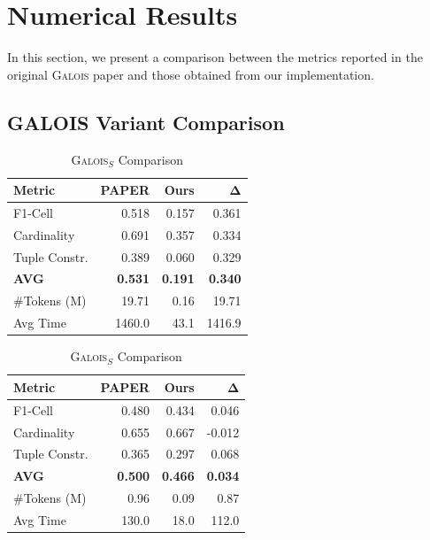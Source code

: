 \section{Numerical Results}
\label{results_galois}
In this section, we present a comparison between the metrics reported in the original \textsc{Galois} paper and those obtained from our implementation.

\subsection{GALOIS Variant Comparison}

\begin{table}[H]
    \centering
    \footnotesize %
    \setlength{\tabcolsep}{3pt} %
    
    \begin{minipage}[t]{0.48\textwidth}
        \centering
        \caption{\textsc{Galois}$_{WO}$ Comparison}
        \label{tab:galoisWO_results}
        \begin{tabular}{lrrr}
            \toprule
            \textbf{Metric} & \textbf{PAPER} & \textbf{Ours} & $\mathbf{\Delta}$ \\
            \midrule
            F1-Cell & 0.518 & 0.157 & 0.361 \\
            Cardinality & 0.691 & 0.357 & 0.334 \\
            Tuple Constr. & 0.389 & 0.060 & 0.329 \\
            \textbf{AVG} & \textbf{0.531} & \textbf{0.191} & \textbf{0.340} \\
            \#Tokens (M) & 19.71 & 0.16 & 19.71 \\
            Avg Time & 1460.0 & 43.1 & 1416.9 \\
            \bottomrule
        \end{tabular}
    \end{minipage}
    \hfill
    \begin{minipage}[t]{0.48\textwidth}
        \centering
        \caption{\textsc{Galois}$_{S}$ Comparison}
        \label{tab:galoiss_results}
        \begin{tabular}{lrrr}
            \toprule
            \textbf{Metric} & \textbf{PAPER} & \textbf{Ours} & $\mathbf{\Delta}$ \\
            \midrule
            F1-Cell & 0.480 & 0.434 & 0.046 \\
            Cardinality & 0.655 & 0.667 & -0.012 \\
            Tuple Constr. & 0.365 & 0.297 & 0.068 \\
            \textbf{AVG} & \textbf{0.500} & \textbf{0.466} & \textbf{0.034} \\
            \#Tokens (M) & 0.96 & 0.09 & 0.87 \\
            Avg Time & 130.0 & 18.0 & 112.0 \\
            \bottomrule
        \end{tabular}
    \end{minipage}


\end{table}
